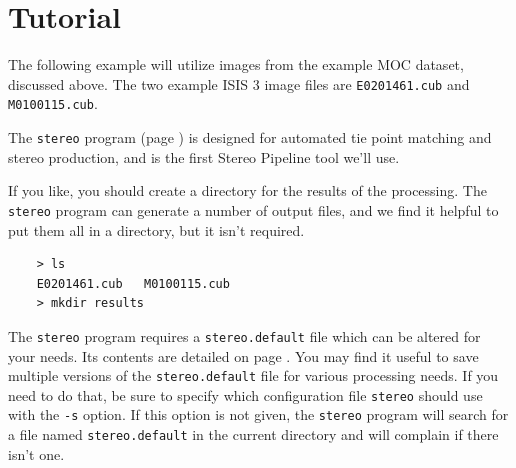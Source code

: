 %
%
%
%


\section{Tutorial}

The following example will utilize images from the example MOC
dataset, discussed above.  The two example ISIS 3 image files are
\texttt{E0201461.cub} and \texttt{M0100115.cub}.

The \texttt{stereo} program (page \pageref{stereo}) is designed for
automated tie point matching and stereo production, and is the first
Stereo Pipeline tool we'll use.

If you like, you should create a directory for the results of the
processing.  The \texttt{stereo} program can generate a number of
output files, and we find it helpful to put them all in a directory,
but it isn't required.

\begin{verbatim}
    > ls
    E0201461.cub   M0100115.cub
    > mkdir results
\end{verbatim}
\noindent
The \texttt{stereo} program requires a \texttt{stereo.default} file
which can be altered for your needs.  Its contents are detailed on
page \pageref{stereo.default}.  You may find it useful to save
multiple versions of the \texttt{stereo.default} file for various
processing needs. If you need to do that, be sure to specify which
configuration file \texttt{stereo} should use with the \texttt{-s}
option.  If this option is not given, the \texttt{stereo} program
will search for a file named \texttt{stereo.default} in the current
directory and will complain if there isn't one.

